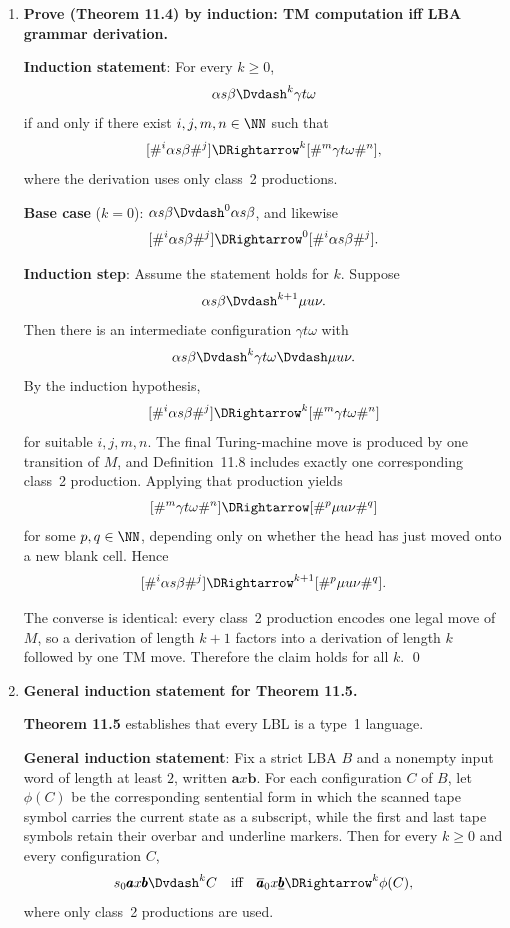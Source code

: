 \begin{enumerate}[{11.}1. ]
\item \textbf{Prove (Theorem 11.4) by induction: TM computation iff LBA grammar derivation.}

\textbf{Induction statement}: For every $k\geq 0$,
\[
\alpha s\beta \Dvdash^k \gamma t\omega
\]
if and only if there exist $i,j,m,n\in\NN$ such that
\[
[\#^i\alpha s\beta\#^j] \DRightarrow^k [\#^m\gamma t\omega\#^n],
\]
where the derivation uses only class~2 productions.

\textbf{Base case} ($k=0$): $\alpha s\beta \Dvdash^0 \alpha s\beta$, and likewise
\[
[\#^i\alpha s\beta\#^j] \DRightarrow^0 [\#^i\alpha s\beta\#^j].
\]

\textbf{Induction step}: Assume the statement holds for $k$. Suppose
\[
\alpha s\beta \Dvdash^{k+1} \mu u\nu.
\]
Then there is an intermediate configuration $\gamma t\omega$ with
\[
\alpha s\beta \Dvdash^k \gamma t\omega \Dvdash \mu u\nu.
\]
By the induction hypothesis,
\[
[\#^i\alpha s\beta\#^j] \DRightarrow^k [\#^m\gamma t\omega\#^n]
\]
for suitable $i,j,m,n$. The final Turing-machine move is produced by one
transition of $M$, and Definition~11.8 includes exactly one corresponding class~2
production. Applying that production yields
\[
[\#^m\gamma t\omega\#^n] \DRightarrow [\#^p\mu u\nu\#^q]
\]
for some $p,q\in\NN$, depending only on whether the head has just moved onto a
new blank cell. Hence
\[
[\#^i\alpha s\beta\#^j] \DRightarrow^{k+1} [\#^p\mu u\nu\#^q].
\]

The converse is identical: every class~2 production encodes one legal move of
$M$, so a derivation of length $k+1$ factors into a derivation of length $k$
followed by one TM move. Therefore the claim holds for all $k$. \qed

\item \textbf{General induction statement for Theorem 11.5.}

\textbf{Theorem 11.5} establishes that every LBL is a type~1 language.

\textbf{General induction statement}: Fix a strict LBA $B$ and a nonempty input
word of length at least $2$, written $\pmb{a}x\pmb{b}$. For each configuration
$C$ of $B$, let $\phi(C)$ be the corresponding sentential form in which the
scanned tape symbol carries the current state as a subscript, while the first
and last tape symbols retain their overbar and underline markers. Then for every
$k\geq 0$ and every configuration $C$,
\[
s_0\pmb{a}x\pmb{b} \Dvdash^k C
\quad\text{iff}\quad
\overline{\pmb{a}}_0x\underline{\pmb{b}} \DRightarrow^k \phi(C),
\]
where only class~2 productions are used.


\end{enumerate}

